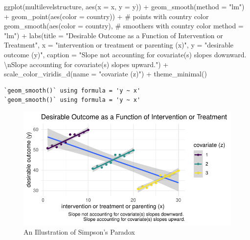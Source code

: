 \documentclass[
  letterpaper,
  DIV=11,
  numbers=noendperiod]{scrreprt}
\newenvironment{Shaded}{\begin{snugshade}}{\end{snugshade}}
\newcommand{\AttributeTok}[1]{\textcolor[rgb]{0.40,0.45,0.13}{#1}}
\newcommand{\CommentTok}[1]{\textcolor[rgb]{0.37,0.37,0.37}{#1}}
\newcommand{\FunctionTok}[1]{\textcolor[rgb]{0.28,0.35,0.67}{#1}}
\newcommand{\NormalTok}[1]{\textcolor[rgb]{0.00,0.23,0.31}{#1}}
\newcommand{\SpecialCharTok}[1]{\textcolor[rgb]{0.37,0.37,0.37}{#1}}
\newcommand{\StringTok}[1]{\textcolor[rgb]{0.13,0.47,0.30}{#1}}
\begin{document}
\begin{Shaded}
\begin{Highlighting}[]
\FunctionTok{ggplot}\NormalTok{(multilevelstructure, }
             \FunctionTok{aes}\NormalTok{(}\AttributeTok{x =}\NormalTok{ x,}
                 \AttributeTok{y =}\NormalTok{ y)) }\SpecialCharTok{+}
  \FunctionTok{geom\_smooth}\NormalTok{(}\AttributeTok{method =} \StringTok{"lm"}\NormalTok{) }\SpecialCharTok{+}
  \FunctionTok{geom\_point}\NormalTok{(}\FunctionTok{aes}\NormalTok{(}\AttributeTok{color =}\NormalTok{ country)) }\SpecialCharTok{+} \CommentTok{\# points with country color}
  \FunctionTok{geom\_smooth}\NormalTok{(}\FunctionTok{aes}\NormalTok{(}\AttributeTok{color =}\NormalTok{ country), }\CommentTok{\# smoothers with country color}
              \AttributeTok{method =} \StringTok{"lm"}\NormalTok{) }\SpecialCharTok{+} 
  \FunctionTok{labs}\NormalTok{(}\AttributeTok{title =} \StringTok{"Desirable Outcome as a Function of Intervention or Treatment"}\NormalTok{,}
       \AttributeTok{x =} \StringTok{"intervention or treatment or parenting (x)"}\NormalTok{,}
       \AttributeTok{y =} \StringTok{"desirable outcome (y)"}\NormalTok{,}
       \AttributeTok{caption =} \StringTok{"Slope not accounting for covariate(s) slopes downward. }\SpecialCharTok{\textbackslash{}n}\StringTok{Slope accounting for covariate(s) slopes upward."}\NormalTok{) }\SpecialCharTok{+}
  \FunctionTok{scale\_color\_viridis\_d}\NormalTok{(}\AttributeTok{name =} \StringTok{"covariate (z)"}\NormalTok{) }\SpecialCharTok{+}
  \FunctionTok{theme\_minimal}\NormalTok{() }
\end{Highlighting}
\end{Shaded}

\begin{verbatim}
`geom_smooth()` using formula = 'y ~ x'
`geom_smooth()` using formula = 'y ~ x'
\end{verbatim}

\begin{figure}[H]

{\centering \includegraphics{./longitudinal_files/figure-pdf/fig-Simpson-1.pdf}

}

\caption{\label{fig-Simpson}An Illustration of Simpson's Paradox}

\end{figure}
\end{document}
